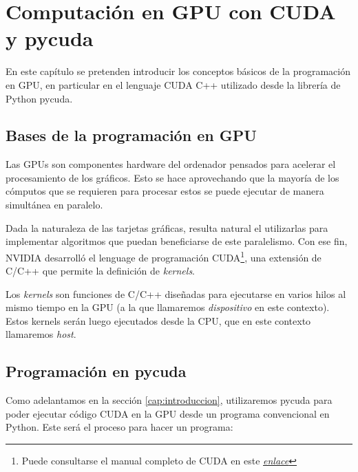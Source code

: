 \chapter{Computación en \ac{GPU} con CUDA y pycuda}
\label{cap:computacion}

\begin{resumen}
	En este capítulo se pretenden introducir los conceptos básicos de la programación en \ac{GPU}, en particular en el lenguaje CUDA C++ utilizado desde la librería de Python pycuda.
\end{resumen}


\section{Bases de la programación en \ac{GPU}}
Las \ac{GPU}s son componentes hardware del ordenador pensados para acelerar el procesamiento de los gráficos. Esto se hace aprovechando que la mayoría de los cómputos que se requieren para procesar estos se puede ejecutar de manera simultánea en paralelo.

Dada la naturaleza de las tarjetas gráficas, resulta natural el utilizarlas para implementar algoritmos que puedan beneficiarse de este paralelismo. Con ese fin, NVIDIA desarrolló el lenguage de programación \ac{CUDA}\footnote{Puede consultarse el manual completo de \ac{CUDA} en este \href{https://docs.nvidia.com/cuda/pdf/CUDA_C_Programming_Guide.pdf}{\emph{enlace}}}, una extensión de C/C++ que permite la definición de \emph{kernels}. 

Los \emph{kernels} son funciones de C/C++ diseñadas para ejecutarse en varios hilos al mismo tiempo en la \ac{GPU} (a la que llamaremos \emph{dispositivo} en este contexto). Estos kernels serán luego ejecutados desde la \ac{CPU}, que en este contexto llamaremos \emph{host}.



\section{Programación en pycuda}
Como adelantamos en la sección \ref{cap:introduccion}, utilizaremos pycuda para poder ejecutar código \ac{CUDA} en la GPU desde un programa convencional en Python. Este será el proceso para hacer un programa:

